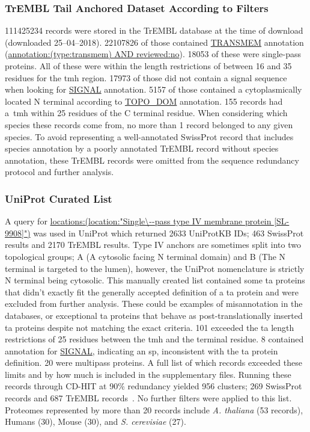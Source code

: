 \subsubsection{TrEMBL Tail Anchored Dataset According to Filters}
111425234 records were stored in the TrEMBL database at the time of download (downloaded 25--04--2018).
22107826 of those contained \url{TRANSMEM} annotation (\url{annotation:(type:transmem) AND reviewed:no}).
18053 of these were single\--pass proteins.
All of these were within the length restrictions of between 16 and 35 residues for the \gls{tmh} region.
17973 of those did not contain a signal sequence when looking for \url{SIGNAL} annotation.
5157 of those contained a cytoplasmically located N terminal according to \url{TOPO_DOM} annotation.
155 records had a~\gls{tmh} within 25 residues of the C terminal residue.
When considering which species these records come from, no more than 1 record belonged to any given species.
To avoid representing a well-annotated SwissProt record that includes species annotation by a poorly annotated TrEMBL record without species annotation, these TrEMBL records were omitted from the sequence redundancy protocol and further analysis.

\subsubsection{UniProt Curated List}
A query for \url{locations:(location:"Single\--pass type IV membrane protein [SL-9908]")} was used in UniProt which returned 2633 UniProtKB IDs; 463 SwissProt results and 2170 TrEMBL results.
Type IV anchors are sometimes split into two topological groups; A (A cytosolic facing N terminal domain) and B (The N terminal is targeted to the lumen), however, the UniProt nomenclature is strictly N terminal being cytosolic.
This manually created list contained some \gls{ta} proteins that didn't exactly fit the generally accepted definition of a \gls{ta} protein and were excluded from further analysis.
These could be examples of misannotation in the databases, or exceptional \gls{ta} proteins that behave as post-translationally inserted \gls{ta} proteins despite not matching the exact criteria.
101 exceeded the \gls{ta} length restrictions of 25 residues between the \gls{tmh} and the terminal residue.
8 contained annotation for \url{SIGNAL}, indicating an \gls{sp}, inconsistent with the \gls{ta} protein definition.
20 were multipass proteins.
A full list of which records exceeded these limits and by how much is included in the supplementary files.
Running these records through CD-HIT at 90\% redundancy yielded 956 clusters; 269 SwissProt records and 687 TrEMBL records~\cite{Huang2010, Wu2011}.
No further filters were applied to this list.
Proteomes represented by more than 20 records include \textit{A. thaliana} (53 records), Humans (30), Mouse (30), and \textit{S. cerevisiae} (27). %

